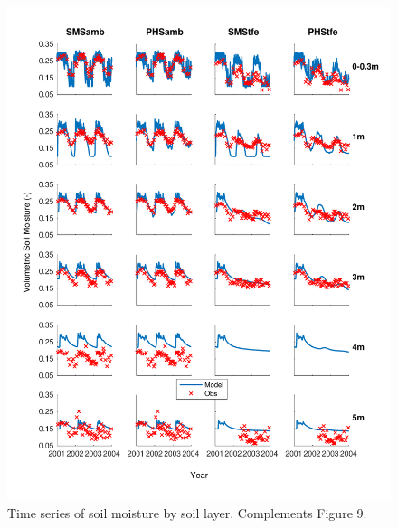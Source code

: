 \documentclass[draft]{agujournal}
\begin{document}
    \begin{figure}[h]
     \centering
     \includegraphics[width=30pc]{figs/suppsm2.pdf}
     \caption{Time series of soil moisture by soil layer.
     Complements Figure 9.}
     \label{supp:sm2}
  \end{figure}
          \clearpage
          
\end{document}
